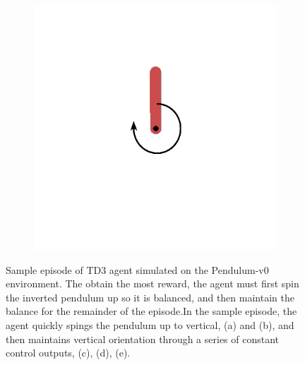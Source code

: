 \documentclass{article}
\begin{document}
\begin{figure}[!p]
\begin{subfigure}{0.18\textwidth}
  \caption{}
  \end{subfigure}
  \begin{subfigure}{0.18\textwidth}
  \centering
  \includegraphics[width=\textwidth]{figures/pendulum/f5}
  \caption{}
  \end{subfigure}
  \caption{Sample episode of TD3 agent simulated on the Pendulum-v0 environment. The obtain the most reward, the agent must first spin the inverted pendulum up so it is balanced, and then maintain the balance for the remainder of the episode.In the sample episode, the agent quickly spings the pendulum up to vertical, (a) and (b), and then maintains vertical orientation through a series of constant control outputs, (c), (d), (e).}
  \label{fig:pendulum_episode}
\end{figure}
\end{document}
